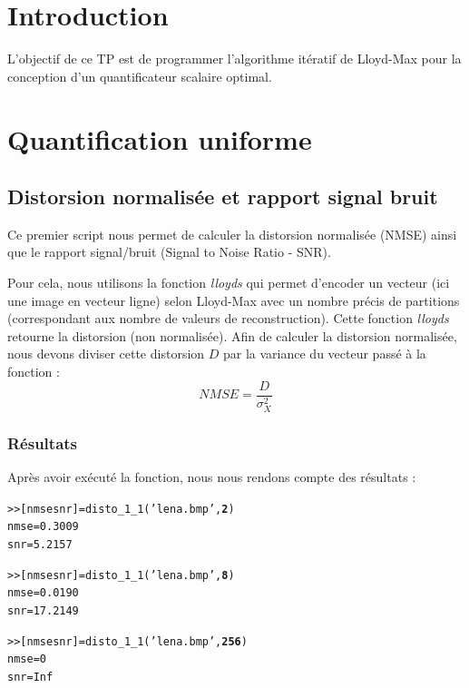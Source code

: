 \documentclass[a4paper, 12pt]{article}
\begin{document}






\clearpage

\section{Introduction}
L'objectif de ce TP est de programmer l'algorithme itératif de Lloyd-Max pour la conception d'un quantificateur scalaire optimal.

\section{Quantification uniforme}

\subsection{Distorsion normalisée et rapport signal bruit}\label{dist_nmse_snr}

Ce premier script nous permet de calculer la distorsion normalisée (NMSE) ainsi que le rapport signal/bruit (Signal to Noise Ratio - SNR).

Pour cela, nous utilisons la fonction \textit{lloyds} qui permet d'encoder un vecteur (ici une image en vecteur ligne) selon Lloyd-Max avec un nombre précis de partitions (correspondant aux nombre de valeurs de reconstruction). Cette fonction \textit{lloyds} retourne la distorsion (non normalisée). Afin de calculer la distorsion normalisée, nous devons diviser cette distorsion $D$ par la variance du vecteur passé à la fonction :
		\[NMSE = \frac{D}{\sigma_X^2} 
	\]


\subsubsection{R\'esultats}
\label{sec:Resultats}

Après avoir exécuté la fonction, nous nous rendons compte des résultats : 

\begin{alltt}
>> [nmse snr] = disto_1_1('lena.bmp', \textbf{2})
nmse = 0.3009
snr = 5.2157

>> [nmse snr] = disto_1_1('lena.bmp', \textbf{8})
nmse = 0.0190
snr = 17.2149

>> [nmse snr] = disto_1_1('lena.bmp', \textbf{256})
nmse = 0
snr = Inf
\end{alltt}
\end{document}
